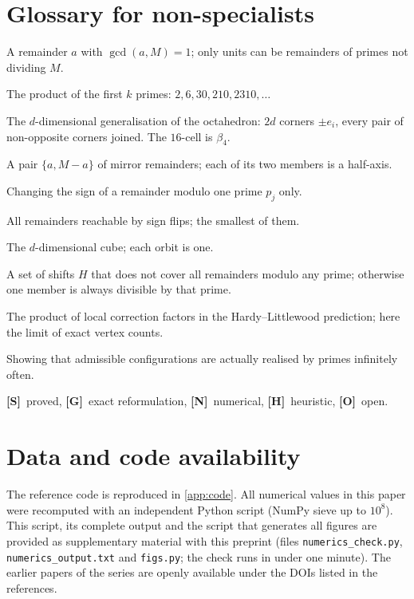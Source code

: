 \documentclass[11pt,a4paper]{article}
\newcommand{\statS}{\textsf{\textbf{[S]}}}
\newcommand{\statG}{\textsf{\textbf{[G]}}}
\newcommand{\statN}{\textsf{\textbf{[N]}}}
\newcommand{\statO}{\textsf{\textbf{[O]}}}
\newcommand{\statH}{\textsf{\textbf{[H]}}}
\theoremstyle{plain}
\theoremstyle{definition}
\theoremstyle{remark}
\begin{document}
\section{Glossary for non-specialists}\label{app:glossary}
\begin{description}[leftmargin=0pt,itemsep=2pt,font=\normalfont\bfseries]
\item[Unit modulo $M$.] A remainder $a$ with $\gcd(a,M)=1$; only units can be
remainders of primes not dividing $M$.
\item[Primorial $M_k$.] The product of the first $k$ primes: $2,6,30,210,2310,\dots$
\item[Cross-polytope $\beta_d$.] The $d$-dimensional generalisation of the
octahedron: $2d$ corners $\pm e_i$, every pair of non-opposite corners joined.
The $16$-cell is $\beta_4$.
\item[Axis, half-axis.] A pair $\{a,M-a\}$ of mirror remainders; each of its two
members is a half-axis.
\item[Sign flip $\sigma_j$.] Changing the sign of a remainder modulo one prime
$p_j$ only.
\item[Orbit, orbit minimum.] All remainders reachable by sign flips; the
smallest of them.
\item[Hypercube $Q_d$.] The $d$-dimensional cube; each orbit is one.
\item[Admissible pattern.] A set of shifts $H$ that does not cover all
remainders modulo any prime; otherwise one member is always divisible by that
prime.
\item[Singular series $\mathfrak S(H)$.] The product of local correction factors
in the Hardy--Littlewood prediction; here the limit of exact vertex counts.
\item[Lifting problem.] Showing that admissible configurations are actually
realised by primes infinitely often.
\item[Status marks.] \statS\ proved, \statG\ exact reformulation, \statN\
numerical, \statH\ heuristic, \statO\ open.
\end{description}

\section*{Data and code availability}
The reference code is reproduced in \cref{app:code}. All numerical values in
this paper were recomputed with an independent Python script (NumPy sieve up
to $10^8$). This script, its complete output and the script that generates all
figures are provided as supplementary material with this preprint
(files \texttt{numerics\_check.py}, \texttt{numerics\_output.txt} and
\texttt{figs.py}; the check runs in under one minute).
The earlier papers of the series are openly available under the DOIs listed in
the references.
\end{document}
